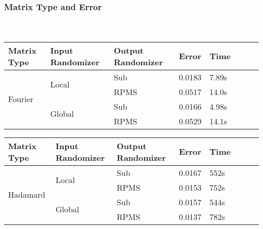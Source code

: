 \begin{frame}[t]
\frametitle{Matrix Type and Error}
\framesubtitle{~~}  %


\begin{table}[h]
\begin{tabular}{lll|lllll}
	\textbf{Matrix Type}     & \textbf{Input Randomizer} & \textbf{Output Randomizer} & \textbf{Error} & \textbf{Time } & \\ \hline
	\multirow{4}{*}{Fourier} & \multirow{2}{*}{Local}    & Sub                        & 0.0183         & 7.89s          & \\
	                         &                           & RPMS                       & 0.0517         & 14.0s          & \\
	                         & \multirow{2}{*}{Global}   & Sub                        & 0.0166         & 4.98s          & \\
	                         &                           & RPMS                       & 0.0529         & 14.1s          & \\
\end{tabular}
\end{table}

\begin{table}[h]
\begin{tabular}{lll|lllll}
	\textbf{Matrix Type}      & \textbf{Input Randomizer} & \textbf{Output Randomizer} & \textbf{Error} & \textbf{Time } & \\ \hline
	\multirow{4}{*}{Hadamard} & \multirow{2}{*}{Local}    & Sub                        & 0.0167         & 552s           & \\
	                          &                           & RPMS                       & 0.0153         & 752s           & \\
	                          & \multirow{2}{*}{Global}   & Sub                        & 0.0157         & 544s           & \\
	                          &                           & RPMS                       & 0.0137         & 782s           & \\
\end{tabular}
\end{table}


\end{frame}


